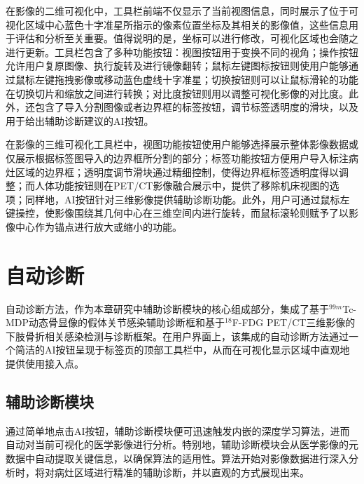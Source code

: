 在影像的二维可视化中，工具栏前端不仅显示了当前视图信息，同时展示了位于可视化区域中心蓝色十字准星所指示的像素位置坐标及其相关的影像值，这些信息用于评估和分析至关重要。值得说明的是，坐标可以进行修改，可视化区域也会随之进行更新。工具栏包含了多种功能按钮：视图按钮用于变换不同的视角；操作按钮允许用户复原图像、执行旋转及进行镜像翻转；鼠标左键图标按钮则使用户能够通过鼠标左键拖拽影像或移动蓝色虚线十字准星；切换按钮则可以让鼠标滑轮的功能在切换切片和缩放之间进行转换；对比度按钮则用以调整可视化影像的对比度。此外，还包含了导入分割图像或者边界框的标签按钮，调节标签透明度的滑块，以及用于给出辅助诊断建议的AI按钮。

在影像的三维可视化工具栏中，视图功能按钮使用户能够选择展示整体影像数据或仅展示根据标签图导入的边界框所分割的部分；标签功能按钮方便用户导入标注病灶区域的边界框；透明度调节滑块通过精细控制，使得边界框标签透明度得以调整；而人体功能按钮则在PET/CT影像融合展示中，提供了移除机床视图的选项；同样地，AI按钮针对三维影像提供辅助诊断功能。此外，用户可通过鼠标左键操控，使影像围绕其几何中心在三维空间内进行旋转，而鼠标滚轮则赋予了以影像中心作为锚点进行放大或缩小的功能。

\section{自动诊断}


自动诊断方法，作为本章研究中辅助诊断模块的核心组成部分，集成了基于\(^{99m}\)Tc-MDP动态骨显像的假体关节感染辅助诊断框和基于\(^{18}\)F-FDG PET/CT三维影像的下肢骨折相关感染检测与诊断框架。在用户界面上，该集成的自动诊断方法通过一个简洁的AI按钮呈现于标签页的顶部工具栏中，从而在可视化显示区域中直观地提供使用接入点。

\subsection{辅助诊断模块}

通过简单地点击AI按钮，辅助诊断模块便可迅速触发内嵌的深度学习算法，进而自动对当前可视化的医学影像进行分析。特别地，辅助诊断模块会从医学影像的元数据中自动提取关键信息，以确保算法的适用性。算法开始对影像数据进行深入分析时，将对病灶区域进行精准的辅助诊断，并以直观的方式展现出来。

